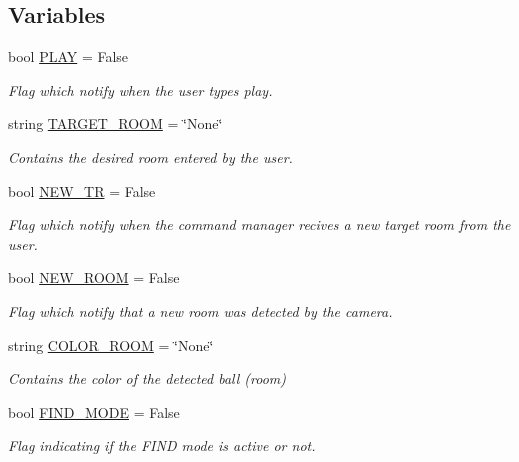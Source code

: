 \subsection*{Variables}
\begin{DoxyCompactItemize}
\item 
bool \hyperlink{namespacecm2_a9d9c51a8b292c088a990a5b74f0fc572}{P\+L\+AY} = False
\begin{DoxyCompactList}\small\item\em Flag which notify when the user types \textquotesingle{}play\textquotesingle{}. \end{DoxyCompactList}\item 
string \hyperlink{namespacecm2_aa4c9405b40d178ce2b7f2f4e3a5eb359}{T\+A\+R\+G\+E\+T\+\_\+\+R\+O\+OM} = \char`\"{}None\char`\"{}
\begin{DoxyCompactList}\small\item\em Contains the desired room entered by the user. \end{DoxyCompactList}\item 
bool \hyperlink{namespacecm2_ab40a0f001925a7d51952f6d61c0f1bc1}{N\+E\+W\+\_\+\+TR} = False
\begin{DoxyCompactList}\small\item\em Flag which notify when the command manager recives a new target room from the user. \end{DoxyCompactList}\item 
bool \hyperlink{namespacecm2_afc7e28693040c02b9b903acdc4ef9676}{N\+E\+W\+\_\+\+R\+O\+OM} = False
\begin{DoxyCompactList}\small\item\em Flag which notify that a new room was detected by the camera. \end{DoxyCompactList}\item 
string \hyperlink{namespacecm2_ae260b3b72cff4373b17d7804c4445605}{C\+O\+L\+O\+R\+\_\+\+R\+O\+OM} = \char`\"{}None\char`\"{}
\begin{DoxyCompactList}\small\item\em Contains the color of the detected ball (room) \end{DoxyCompactList}\item 
bool \hyperlink{namespacecm2_a09c3979998f6574c8221fc68a7c1c528}{F\+I\+N\+D\+\_\+\+M\+O\+DE} = False
\begin{DoxyCompactList}\small\item\em Flag indicating if the F\+I\+ND mode is active or not. \end{DoxyCompactList}\item 

\end{DoxyCompactItemize}
